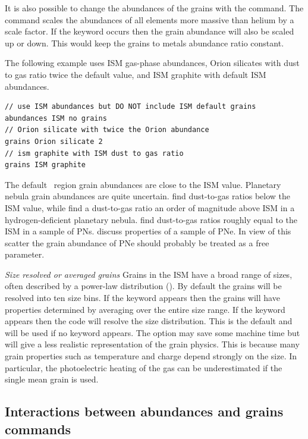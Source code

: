 It is also possible to change the abundances of the grains with the
 command.
The  command scales the
abundances of all elements more massive than helium by a scale factor.
If the keyword  occurs then the grain abundance
will also be scaled up or down.
This would keep the grains to metals abundance ratio constant.

The following example uses ISM gas-phase abundances, Orion silicates
with dust to gas ratio twice the default value,
and ISM graphite with default ISM abundances.
\begin{verbatim}
// use ISM abundances but DO NOT include ISM default grains
abundances ISM no grains
// Orion silicate with twice the Orion abundance
grains Orion silicate 2
// ism graphite with ISM dust to gas ratio
grains ISM graphite
\end{verbatim}
The default \hii\ region grain abundances are close to the ISM value.
Planetary nebula grain abundances are quite uncertain.
\citet{Clegg1989} find dust-to-gas ratios below the ISM value, while
\citet{Borkowski1991} find a dust-to-gas ratio an order of magnitude above ISM
in a hydrogen-deficient planetary nebula.
\citet{Mallik1988} find
dust-to-gas ratios roughly equal to the ISM in a sample of PNs.
\citet{Stasinska1999} discuss properties of a sample of PNe.
In view of this
scatter the grain abundance of PNe should probably be treated as a free
parameter.

\emph{Size resolved or averaged grains} Grains in the ISM have a
broad range of sizes, often described by a power-law distribution
(\citealp{Mathis1977}).
By default the grains will be resolved into ten size bins.
If the keyword  appears then the grains will have
properties determined
by averaging over the entire size range.
If the keyword  appears
then the code will resolve the size distribution.
This is the default and will be used if no keyword appears.
The  option may save some machine
time but will give a less realistic representation of the grain physics.
This is because many grain properties such as temperature and charge
depend strongly on the size.
In particular, the photoelectric heating of the gas
can be underestimated if the single mean grain is used.

\subsection{Interactions between abundances and grains commands}

